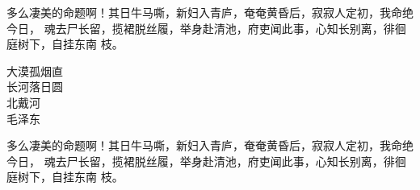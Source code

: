 \documentclass[UTF8,
no-math,
12pt,
openany,
table,
dvipsnames,
svgnames]{article}
\newenvironment{poetry}
  {\begin{center}\Huge\itshape}
  {\end{center}}
\begin{document}
多么凄美的命题啊！其日牛马嘶，新妇入青庐，奄奄黄昏后，寂寂人定初，我命绝今日，
魂去尸长留，揽裙脱丝履，举身赴清池，府吏闻此事，心知长别离，徘徊庭树下，自挂东南
枝。

\begin{poetry}


大漠孤烟直\\
长河落日圆\\
北戴河\\
毛泽东
\end{poetry}

\vspace{2cm}


多么凄美的命题啊！其日牛马嘶，新妇入青庐，奄奄黄昏后，寂寂人定初，我命绝今日，
魂去尸长留，揽裙脱丝履，举身赴清池，府吏闻此事，心知长别离，徘徊庭树下，自挂东南
枝。
\end{document}
